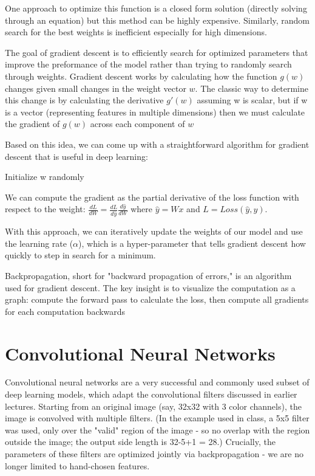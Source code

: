 ﻿\documentclass{article}
\begin{document}
One approach to optimize this function is a closed form solution (directly solving through an equation) but this method can be highly expensive. Similarly, random search for the best weights is inefficient especially for high dimensions.

The goal of gradient descent is to efficiently search for optimized parameters that improve the preformance of the model rather than trying to randomly search through weights. Gradient descent works by calculating how the function $g(w)$ changes given small changes in the weight vector $w$. The classic way to determine this change is by calculating the derivative $g'(w)$ assuming w is scalar, but if w is a vector (representing features in multiple dimensions) then we must calculate the gradient of $g(w)$ across each component of $w$

Based on this idea, we can come up with a straightforward algorithm for gradient descent that is useful in deep learning:

\begin{algorithm}[H]
Initialize w randomly \\
\end{algorithm}

We can compute the gradient as the partial derivative of the loss function with respect to the weight: $\frac{dL}{dW} = \frac{dL}{d\hat{y}}\frac{d\hat{y}}{dW}$ where $\hat{y} = Wx$ and $L = Loss(\hat{y}, y)$.

With this approach, we can iteratively update the weights of our model and use the learning rate ($\alpha$), which is a hyper-parameter that tells gradient descent how quickly to step in search for a minimum.

Backpropagation, short for "backward propagation of errors," is an algorithm used for gradient descent. The key insight is to visualize the computation as a graph: compute the forward pass to calculate the loss, then compute all gradients for each computation backwards

\section{Convolutional Neural Networks}
Convolutional neural networks are a very successful and commonly used subset of deep learning models, which adapt the convolutional filters discussed in earlier lectures. Starting from an original image (say, 32x32 with 3 color channels), the image is convolved with multiple filters. (In the example used in class, a 5x5 filter was used, only over the "valid" region of the image - so no overlap with the region outside the image; the output side length is 32-5+1 = 28.) Crucially, the parameters of these filters are optimized jointly via backpropagation - we are no longer limited to hand-chosen features.
\end{document}
